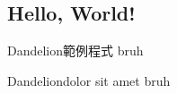 \documentclass{article}
\begin{document}

\begin{large}

\section{Hello, World!}
\begin{boxpar}{Dandelion}{範例程式}
    bruh
\end{boxpar}

\begin{boxpar}{Dandelion}{dolor sit amet}
    bruh
\end{boxpar}

\end{large}
\end{document}
